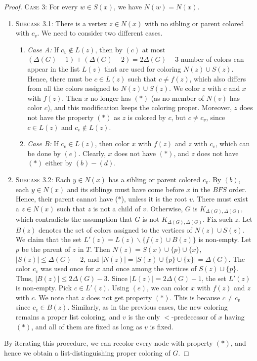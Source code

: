 \documentclass[10pt,a4paper]{amsart}
\begin{document}
\begin{proof}
\noindent  \textsc{Case 3: } For every $w\in S(x)$, we have $N(w) = N(x)$.
\begin{enumerate}
    \item[]\textsc{Subcase 3.1:} There is a vertex $z\in N(x)$ with no sibling or parent colored with $c_v$. We need to consider two different cases.
    \begin{enumerate}
    \item[]\textit{Case A:}
    If $c_v\not\in L(z)$, then by $(c)$ at most $(\Delta(G)-1) + (\Delta(G)-2) = 2\Delta(G)-3$ number of colors can appear in the list $L(z)$ that are used for coloring $N(z)\cup S(z)$. Hence, there must be $c\in L(z)$ such that $c\neq f(z)$, which also differs from all the colors assigned to $N(z)\cup S(z)$. 
    We color $z$ with $c$ and $x$ with $f(z)$.
    Then $x$ no longer has $(\ast)$ (as no member of $N(v)$ has color $c$), and this modification keeps the coloring proper.
    Moreover, $z$ does not have the property 
    $(\ast)$ as $z$ is colored by $c$, but $c\neq c_{v}$, since $c\in L(z)$ and $c_{v}\not\in L(z)$.
   \item[]  \textit{Case B:} If $c_v\in L(z)$, then color $x$ with $f(z)$ and $z$ with $c_{v}$, which can be done by $(e)$. Clearly, $x$ does not have $(\ast)$, and $z$ does not have $(\ast)$ either by $(b)-(d)$. 
    \end{enumerate}
   
    \item[] \textsc{Subcase 3.2:} Each $y \in N(x)$ has a sibling or parent colored $c_v$. By $(b)$, each $y\in N(x)$ and its siblings must have come before $x$ in the $BFS$ order. Hence, their parent cannot have ($\ast$), unless it is the root $v$. There must exist a $z\in N(x)$ such that $z$ is not a child of $v$. Otherwise, $G$ is $K_{\Delta(G),\Delta(G)}$, which contradicts the assumption that $G$ is not $K_{\Delta(G),\Delta(G)}$. 
    Fix such $z$.
    Let $B(z)$ denotes the set of colors assigned to the vertices of $N(z)\cup S(z)$. We claim that the set $L'(z)=L(z)\backslash \{f(z)\cup B(z)\}$ is non-empty. Let $p$ be the parent of $z$ in $T$. Then $N(z) = S(x) \cup \{p\}\cup \{x\}$, $\vert S(z)\vert \leq \Delta(G)-2$, and $\vert N(z)\vert = \vert S(x)\cup \{p\}\cup \{x\}\vert=\Delta(G)$. The color $c_v$ was used once for $x$ and once among the vertices of $S(z) \cup \{p\}$. Thus, $\vert B(z)\vert\leq 2\Delta(G)-3$. Since $\vert L(z)\vert= 2\Delta(G)-1$, the set $L'(z)$ is non-empty.
    Pick $c\in L'(z)$.
    Using $(e)$, we can color $x$ with $f(z)$ and $z$ with $c$.  We note that $z$ does not get property $(\ast)$. This is because $c\neq c_{v}$ since $c_{v} \in B(z)$.
    Similarly, as in the previous cases, the new coloring remains a proper list coloring, and $v$ is the only $<$-predecessor of $x$ having $(\ast)$, and all of them are fixed as long as $v$ is fixed.
\end{enumerate}
By iterating this procedure, we can recolor every node with property $(\ast)$, and hence we obtain a list-distinguishing proper coloring of $G$.
\end{proof}
\end{document}

